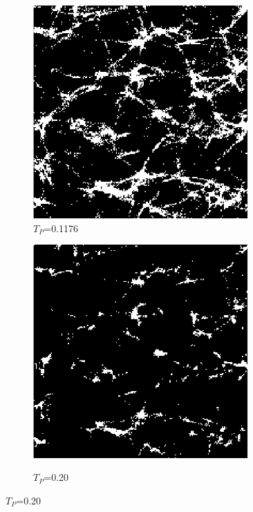 \begin{figure}[!htb]
\begin{minipage}{0.5\textwidth}
  \begin{subfigure}{0.5\textwidth}
    \centering
    \includegraphics[width=0.9\textwidth]{Figures/chapter-image/binary/fig_bin_01176Otsu.png}%
    \caption{$T_P$=0.1176}
    \label{binotsu}
  \end{subfigure}%
  \begin{subfigure}{0.5\textwidth}
    \centering
    \includegraphics[width=0.9\textwidth]{Figures/chapter-image/binary/fig_bin_20.png}%
    \label{bin020}
    \caption{$T_P$=0.20}
  \end{subfigure}%
\end{minipage}


\end{figure}
